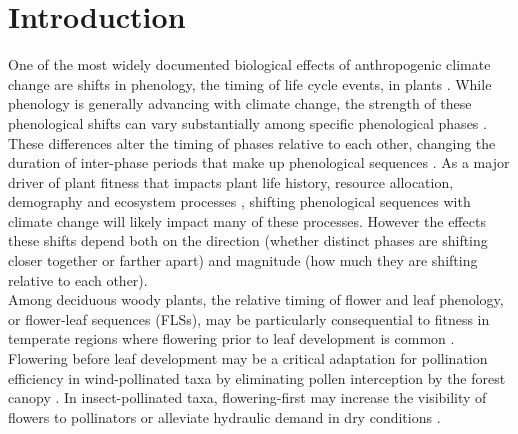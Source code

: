 \documentclass[11pt]{article}
\begin{document}
\section*{Introduction}
\noindent One of the most widely documented biological effects of anthropogenic climate change are shifts in phenology, the timing of life cycle events, in plants \citep{Parmesan2003,Menzel2006,Cleland2007}. While phenology is generally advancing with climate change, the strength of these phenological shifts can vary substantially among specific phenological phases \citep{Augspurger:2020aa}. These differences alter the timing of phases relative to each other, changing the duration of inter-phase periods that make up phenological sequences \citep{Ettinger2018}. As a major driver of plant fitness that impacts plant life history, resource allocation, demography and ecosystem processes \citep{Post:2008aa}, shifting phenological sequences with climate change will likely impact many of these processes. However the effects these shifts depend both on the direction (whether distinct phases are shifting closer together or farther apart) and magnitude (how much they are shifting relative to each other).\\ %

\noindent Among deciduous woody plants, the relative timing of flower and leaf phenology, or flower-leaf sequences (FLSs), may be particularly consequential to fitness in temperate regions where flowering prior to leaf development is common \citep{Rathcke_1985,Gougherty2018}. Flowering before leaf development may be a critical adaptation for pollination efficiency in wind-pollinated taxa by eliminating pollen interception by the forest canopy \citep{Whitehead1969}. In insect-pollinated taxa, flowering-first may increase the visibility of flowers to pollinators \citep{Janzen1967,Savage2019} or alleviate hydraulic demand in dry conditions \citep{Gougherty2018, Franklin2016}.\\ %
\end{document}
